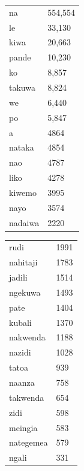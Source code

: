 \documentclass[output=paper,colorlinks,citecolor=brown,
]{langscibook}
\begin{document}
\begin{table}  


 \lsptoprule 
\begin{minipage}{.3\textwidth}
\begin{tabular}{ll} 
na & 554,554 \\
le & 33,130 \\
ki{w}a & 20,663 \\
pande & 10,230 \\
ko & 8,857 \\
{ta}kuwa & 8,824 \\
we &6,440 \\
po & 5,847 \\
a & 4864 \\
na{tak}a & 4854 \\
nao & 4787 \\
{li}ko & 4278 \\
kiwemo & 3995 \\
nayo & 3574 \\
{na}{daiw}a & 2220 \\

\end{tabular}
\end{minipage}
\begin{minipage}{.3\textwidth}
\begin{tabular}{ll}
{rudi} & 1991 \\ 
{na}{hitaji} & 1783\\
{jadili} & 1514 \\
{nge}ku{w}a & 1493 \\
{pat}e & 1404 \\ 
{kubali} & 1370 \\ 
{na}kw{end}a &  1188 \\ 
{na}{zidi} & 1028 \\ 
{ta}{to}a & 939 \\ 
{na}{anz}a & 758 \\ 
{ta}kw{end}a  & 654  \\   
{zidi}& 598 \\ 
{me}ingia    & 583 \\ 
{na}{tegemea}    & 579 \\ 

ngali & 331 \\ 


\end{tabular}
\end{minipage}
\end{table}
\end{document}
